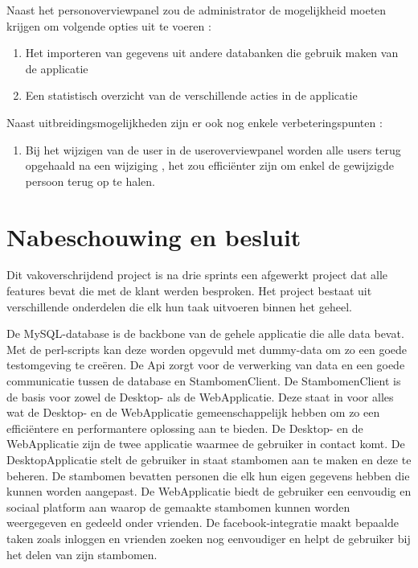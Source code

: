 \documentclass[pdftex,a4paper,12pt,twoside]{report}
\begin{document}
Naast het personoverviewpanel zou de administrator de mogelijkheid moeten krijgen om volgende opties uit te voeren :
\begin{enumerate}
\item \label{it:first} Het importeren van gegevens uit andere databanken die gebruik maken van de applicatie
\item \label{it:first} Een statistisch overzicht van de verschillende acties in de applicatie
\end{enumerate}









Naast uitbreidingsmogelijkheden zijn er ook nog enkele verbeteringspunten :

\begin{enumerate}
\item \label{it:first} Bij het wijzigen van de user in de useroverviewpanel worden alle users terug opgehaald na een wijziging , het zou efficiënter zijn om enkel de gewijzigde persoon terug op te halen.
\end{enumerate}



\chapter{Nabeschouwing en besluit}
Dit vakoverschrijdend project is na drie sprints een afgewerkt project dat alle features bevat die met de klant werden besproken. Het project bestaat uit verschillende onderdelen die elk hun taak uitvoeren binnen het geheel.

De MySQL-database is de backbone van de gehele applicatie die alle data bevat. Met de perl-scripts kan deze worden opgevuld met dummy-data om zo een goede testomgeving te creëren. De Api zorgt voor de verwerking van data en een goede communicatie tussen de database en StambomenClient. De StambomenClient is de basis voor zowel de Desktop- als de WebApplicatie. Deze staat in voor alles wat de Desktop- en de WebApplicatie gemeenschappelijk hebben om zo een efficiëntere en performantere oplossing aan te bieden. De Desktop- en de WebApplicatie zijn de twee applicatie waarmee de gebruiker in contact komt. De DesktopApplicatie stelt de gebruiker in staat stambomen aan te maken en deze te beheren. De stambomen bevatten personen die elk hun eigen gegevens hebben die kunnen worden aangepast. De WebApplicatie biedt de gebruiker een eenvoudig en sociaal platform aan waarop de gemaakte stambomen kunnen worden weergegeven en gedeeld onder vrienden. De facebook-integratie maakt bepaalde taken zoals inloggen en vrienden zoeken nog eenvoudiger en helpt de gebruiker bij het delen van zijn stambomen.
\end{document}
